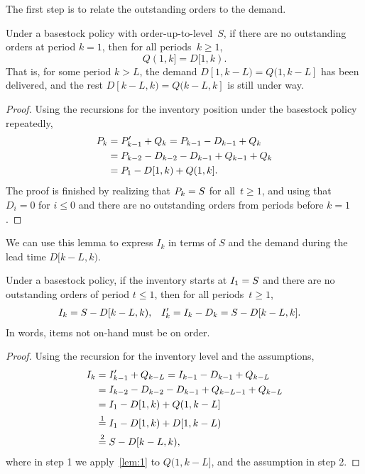\documentclass[stochastic-or.tex]{subfiles}
\begin{document}
The first step is to relate the outstanding orders to the demand.
\begin{lemma}\label{lem:1}
Under a basestock policy with  order-up-to-level~$S$, if there are no outstanding orders at period  $k=1$, then for all periods~$k\geq 1$,
\begin{equation*}
Q(1, k] = D[1, k).
\end{equation*}
That is, for some period $k > L$, the demand $D[1, k-L) = Q(1, k-L]$ has been delivered, and the rest $D[k-L, k) = Q(k-L, k]$ is still under way.
\end{lemma}
\begin{proof}
Using the recursions for the inventory position under the basestock policy repeatedly,
\begin{align*}
    P_k
&= P_{k-1}'+ Q_k
= P_{k-1} -D_{k-1}+ Q_k  \\
&= P_{k-2} -D_{k-2} - D_{k-1}+  Q_{k-1}+ Q_k  \\
&= P_1 - D[1, k) +     Q(1, k].
\end{align*}
The proof is finished by realizing that $P_{k} = S$ for all~$t\geq 1$, and using that $D_{i} = 0$ for $i\leq 0$ and there are no outstanding orders from periods before $k=1$.
\end{proof}

We can use this lemma to express $I_{k}$ in terms of $S$ and the demand during the lead time $D[k-L, k)$.
\begin{lemma}\label{lem:2}
Under a basestock policy, if the inventory starts at $I_{1} = S$ and there are no outstanding orders of period $t \leq 1$, then for all periods~$t\geq 1$,
  \begin{align*}
    I_k&= S - D[k-L, k), &  I_k'&= I_{k} - D_{k} = S - D[k-L, k].
  \end{align*}
In words, items not on-hand must be on order.
\end{lemma}
\begin{proof}
Using the recursion for the inventory level and the assumptions,
\begin{align*}
  I_{k}
&= I_{k-1}' + Q_{k-L}
= I_{k-1} -D_{k-1}+ Q_{k-L} \\
&= I_{k-2}- D_{k-2}  - D_{k-1} +Q_{k-L-1} + Q_{k-L}\\
&= I_{1}- D[1, k) + Q(1, k-L] \\
&\stackrel1= I_{1}- D[1, k) + D[1, k-L) \\
&\stackrel2= S - D[k-L, k),
\end{align*}
where in step 1 we apply~\cref{lem:1} to $Q(1, k-L]$, and the assumption in step 2.
\end{proof}
\end{document}
